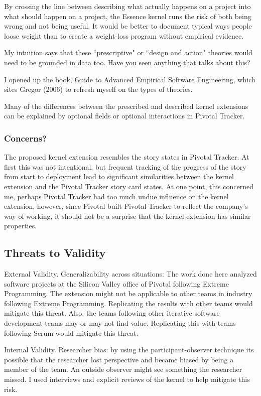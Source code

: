 \documentclass[preprint,12pt,3p]{elsarticle}
\begin{document}
By crossing the line between describing what actually happens on a project into what should happen on a project, the Essence kernel runs the risk of both being wrong and not being useful.  It would be better to document typical ways people loose weight than to create a weight-loss program without empirical evidence. 

My intuition says that these ``prescriptive" or ``design and action" theories would need to be grounded in data too. Have you seen anything that talks about this?

I opened up the book, Guide to Advanced Empirical Software Engineering,  which sites Gregor (2006) to refresh myself on the types of theories.

Many of the differences between the prescribed and described kernel extensions can be explained by optional fields or optional interactions in Pivotal Tracker.

\subsubsection{Concerns?}
The proposed kernel extension resembles the story states in Pivotal Tracker. At first this was not intentional, but frequent tracking of the progress of the story from start to deployment lead to significant similarities between the kernel extension and the Pivotal Tracker story card states. At one point, this concerned me, perhaps Pivotal Tracker had too much undue influence on the kernel extension, however, since Pivotal built Pivotal Tracker to reflect the company's way of working, it should not be a surprise that the kernel extension has similar properties.

\subsection{Threats to Validity}

External Validity. Generalizability across situations: The work done here analyzed software projects at the Silicon Valley office of Pivotal following Extreme Programming. The extension might not be applicable to other teams in industry following Extreme Programming. Replicating the results with other teams would mitigate this threat. Also, the teams following other iterative software development teams may or may not find value. Replicating this with teams following Scrum would mitigate this threat.

Internal Validity. Researcher bias: by using the participant-observer technique its possible that the researcher lost perspective and became biased by being a member of the team. An outside observer might see something the researcher missed. I used interviews and explicit reviews of the kernel to help mitigate this risk.
\end{document}
